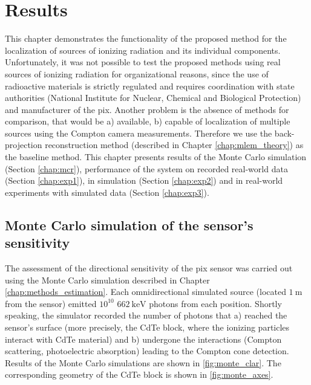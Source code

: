 \chapter{Results\label{chap:results}}
This chapter demonstrates the functionality of the proposed method for the localization of sources of ionizing radiation and its individual components.
Unfortunately, it was not possible to test the proposed methods using real sources of ionizing radiation for organizational reasons, since the use of radioactive materials is strictly regulated and requires coordination with state authorities (National Institute for Nuclear, Chemical and Biological Protection) and manufacturer of the \ac{pix}.
Another problem is the absence of methods for comparison, that would be a) available, b) capable of localization of multiple sources using the Compton camera measurements.
Therefore we use the back-projection reconstruction method (described in Chapter \ref{chap:mlem_theory}) as the baseline method.
This chapter presents results of the Monte Carlo simulation (Section \ref{chap:mcr}), performance of the system on recorded real-world data (Section \ref{chap:exp1}), in simulation (Section \ref{chap:exp2}) and in real-world experiments with simulated data (Section \ref{chap:exp3}). 

\section{Monte Carlo simulation of the sensor's sensitivity\label{chap:mcr}}
The assessment of the directional sensitivity of the \ac{pix} sensor was carried out using the Monte Carlo simulation described in Chapter \ref{chap:methods_estimation}.
Each omnidirectional simulated source (located $\SI{1}{\meter}$ from the sensor) emitted $10^{10}$ $\SI{662}{\kilo\electronvolt}$ photons from each position.
Shortly speaking, the simulator recorded the number of photons that a) reached the sensor's surface (more precisely, the \ac{CdTe} block, where the ionizing particles interact with \ac{CdTe} material) and b) undergone the interactions (Compton scattering, photoelectric absorption) leading to the Compton cone detection.  
Results of the Monte Carlo simulations are shown in \autoref{fig:monte_clar}.
The corresponding geometry of the \ac{CdTe} block is shown in \ref{fig:monte_axes}.

